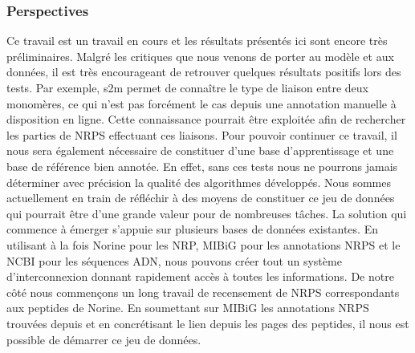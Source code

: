 \subsubsection{Perspectives}

Ce travail est un travail en cours et les résultats présentés ici sont encore très préliminaires.
Malgré les critiques que nous venons de porter au modèle et aux données, il est très encourageant de retrouver quelques résultats positifs lors des tests.
Par exemple, s2m permet de connaître le type de liaison entre deux monomères, ce qui n'est pas forcément le cas depuis une annotation manuelle à disposition en ligne.
Cette connaissance pourrait être exploitée afin de rechercher les parties de NRPS effectuant ces liaisons.
Pour pouvoir continuer ce travail, il nous sera également nécessaire de constituer d'une base d'apprentissage et une base de référence bien annotée.
En effet, sans ces tests nous ne pourrons jamais déterminer avec précision la qualité des algorithmes développés.
Nous sommes actuellement en train de réfléchir à des moyens de constituer ce jeu de données qui pourrait être d'une grande valeur pour de nombreuses tâches.
La solution qui commence à émerger s'appuie sur plusieurs bases de données existantes.
En utilisant à la fois Norine pour les NRP, MIBiG pour les annotations NRPS et le NCBI pour les séquences ADN, nous pouvons créer tout un système d'interconnexion donnant rapidement accès à toutes les informations.
De notre côté nous commençons un long travail de recensement de NRPS correspondants aux peptides de Norine.
En soumettant sur MIBiG les annotations NRPS trouvées depuis et en concrétisant le lien depuis les pages des peptides, il nous est possible de démarrer ce jeu de données.